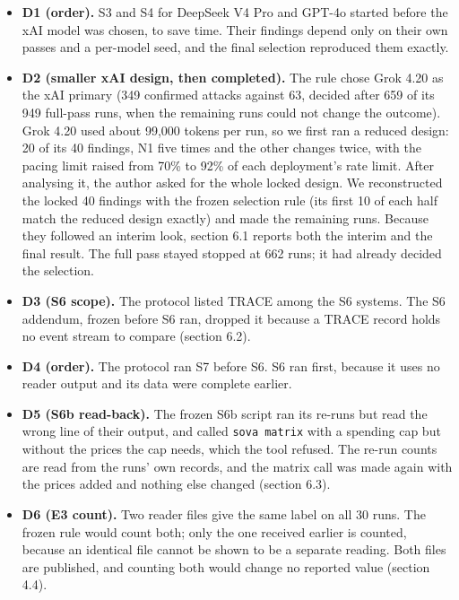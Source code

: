 \documentclass[
  american,
  10pt,
  a4paper,
]{article}
\providecommand{\tightlist}{%
  \setlength{\itemsep}{0pt}\setlength{\parskip}{0pt}}
\begin{document}
\begin{itemize}
\tightlist
\item
  \textbf{D1 (order).} S3 and S4 for DeepSeek V4 Pro and GPT-4o started
  before the xAI model was chosen, to save time. Their findings depend
  only on their own passes and a per-model seed, and the final selection
  reproduced them exactly.
\item
  \textbf{D2 (smaller xAI design, then completed).} The rule chose Grok
  4.20 as the xAI primary (349 confirmed attacks against 63, decided
  after 659 of its 949 full-pass runs, when the remaining runs could not
  change the outcome). Grok 4.20 used about 99,000 tokens per run, so we
  first ran a reduced design: 20 of its 40 findings, N1 five times and
  the other changes twice, with the pacing limit raised from 70\% to
  92\% of each deployment's rate limit. After analysing it, the author
  asked for the whole locked design. We reconstructed the locked 40
  findings with the frozen selection rule (its first 10 of each half
  match the reduced design exactly) and made the remaining runs. Because
  they followed an interim look, section 6.1 reports both the interim
  and the final result. The full pass stayed stopped at 662 runs; it had
  already decided the selection.
\item
  \textbf{D3 (S6 scope).} The protocol listed TRACE among the S6
  systems. The S6 addendum, frozen before S6 ran, dropped it because a
  TRACE record holds no event stream to compare (section 6.2).
\item
  \textbf{D4 (order).} The protocol ran S7 before S6. S6 ran first,
  because it uses no reader output and its data were complete earlier.
\item
  \textbf{D5 (S6b read-back).} The frozen S6b script ran its re-runs but
  read the wrong line of their output, and called \texttt{sova\ matrix}
  with a spending cap but without the prices the cap needs, which the
  tool refused. The re-run counts are read from the runs' own records,
  and the matrix call was made again with the prices added and nothing
  else changed (section 6.3).
\item
  \textbf{D6 (E3 count).} Two reader files give the same label on all 30
  runs. The frozen rule would count both; only the one received earlier
  is counted, because an identical file cannot be shown to be a separate
  reading. Both files are published, and counting both would change no
  reported value (section 4.4).
\end{itemize}
\end{document}
